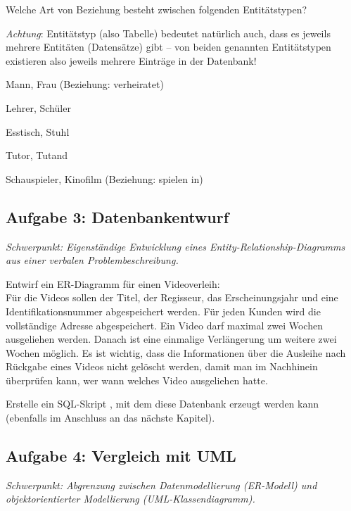 Welche Art von Beziehung besteht zwischen folgenden Entitätstypen? 

\emph{Achtung}: Entitätstyp (also Tabelle) bedeutet natürlich auch, dass es
jeweils mehrere Entitäten (Datensätze) gibt -- von beiden genannten
Entitätstypen existieren also jeweils mehrere Einträge in der Datenbank!

\begin{compactenum}[a)]
\item Mann, Frau (Beziehung: \glqq verheiratet\grqq )
\item Lehrer, Schüler
\item Esstisch, Stuhl
\item Tutor, Tutand
\item Schauspieler, Kinofilm (Beziehung: \glqq spielen in\grqq )
\end{compactenum}


\subsection{Aufgabe 3: Datenbankentwurf \tagZusatz \tagLK}
\noindent \emph{Schwerpunkt: Eigenständige Entwicklung eines Entity-Relationship-Diagramms aus einer verbalen Problembeschreibung.}

\begin{compactenum}[a)] 
\item Entwirf ein ER-Diagramm für einen Videoverleih:\\
Für die Videos sollen der Titel, der Regisseur, das Erscheinungsjahr und eine
Identifikationsnummer abgespeichert werden. Für jeden Kunden wird die
vollständige Adresse abgespeichert. Ein Video darf maximal zwei Wochen
ausgeliehen werden. Danach ist eine einmalige Verlängerung um weitere zwei
Wochen möglich. Es ist wichtig, dass die Informationen über die Ausleihe nach
Rückgabe eines Videos nicht gelöscht werden, damit man im Nachhinein überprüfen
kann, wer wann welches Video ausgeliehen hatte.
\item Erstelle ein SQL-Skript , mit dem diese
Datenbank erzeugt werden kann (ebenfalls im Anschluss an das nächste Kapitel).
\end{compactenum}

\pagebreak
 
\subsection{Aufgabe 4: Vergleich mit UML \tagLK}
\noindent \emph{Schwerpunkt: Abgrenzung zwischen Datenmodellierung (ER-Modell) und objektorientierter Modellierung (UML-Klassendiagramm).}

